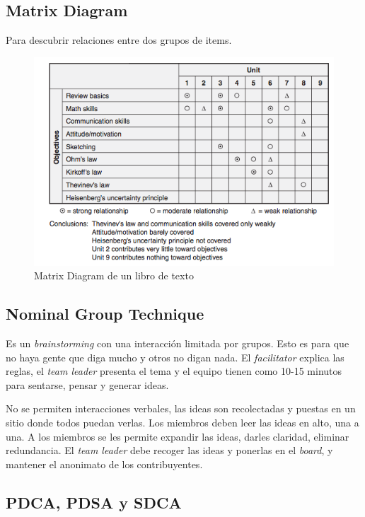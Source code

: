 \documentclass[]{article}
\begin{document}
\subsection{Matrix Diagram}

Para descubrir relaciones entre dos grupos de items. 

\begin{figure}[ht!]
	\centering
	\includegraphics[width=120mm]{imagenes/MatrixDiagram.png}
	\caption{Matrix Diagram de un libro de texto}
	\label{fig:MatrixDiagram}
\end{figure}

\subsection{Nominal Group Technique}

Es un \textit{brainstorming} con una interacción limitada por grupos. Esto es para que no haya gente que diga mucho y otros no digan nada. El \textit{facilitator} explica las reglas, el \textit{team leader} presenta el tema y el equipo tienen como 10-15 minutos para sentarse, pensar y generar ideas.

No se permiten interacciones verbales, las ideas son recolectadas y puestas en un sitio donde todos puedan verlas. Los miembros deben leer las ideas en alto, una a una. A los miembros se les permite expandir las ideas, darles claridad, eliminar redundancia. El \textit{team leader} debe recoger las ideas y ponerlas en el \textit{board}, y mantener el anonimato de los contribuyentes.

\subsection{PDCA, PDSA y SDCA}
\end{document}
